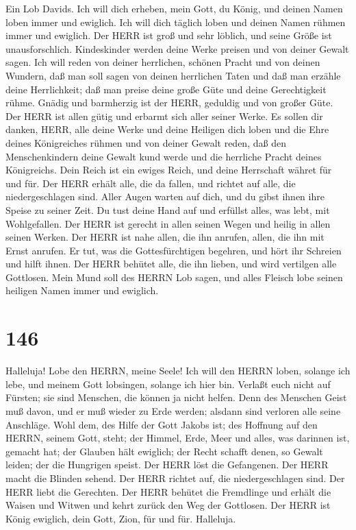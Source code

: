  Ein Lob Davids. Ich will dich erheben, mein Gott, du König,
und deinen Namen loben immer und ewiglich.  Ich will dich
täglich loben und deinen Namen rühmen immer und ewiglich. 
Der HERR ist groß und sehr löblich, und seine Größe ist unausforschlich.
 Kindeskinder werden deine Werke preisen und von deiner
Gewalt sagen.  Ich will reden von deiner herrlichen, schönen
Pracht und von deinen Wundern,  daß man soll sagen von
deinen herrlichen Taten und daß man erzähle deine Herrlichkeit;
 daß man preise deine große Güte und deine Gerechtigkeit
rühme.  Gnädig und barmherzig ist der HERR, geduldig und von
großer Güte.  Der HERR ist allen gütig und erbarmt sich
aller seiner Werke.  Es sollen dir danken, HERR, alle deine
Werke und deine Heiligen dich loben  und die Ehre deines
Königreiches rühmen und von deiner Gewalt reden,  daß den
Menschenkindern deine Gewalt kund werde und die herrliche Pracht deines
Königreichs.  Dein Reich ist ein ewiges Reich, und deine
Herrschaft währet für und für.  Der HERR erhält alle, die
da fallen, und richtet auf alle, die niedergeschlagen sind.
 Aller Augen warten auf dich, und du gibst ihnen ihre
Speise zu seiner Zeit.  Du tust deine Hand auf und erfüllst
alles, was lebt, mit Wohlgefallen.  Der HERR ist gerecht in
allen seinen Wegen und heilig in allen seinen Werken.  Der
HERR ist nahe allen, die ihn anrufen, allen, die ihn mit Ernst anrufen.
 Er tut, was die Gottesfürchtigen begehren, und hört ihr
Schreien und hilft ihnen.  Der HERR behütet alle, die ihn
lieben, und wird vertilgen alle Gottlosen.  Mein Mund soll
des HERRN Lob sagen, und alles Fleisch lobe seinen heiligen Namen immer
und ewiglich.

\hypertarget{section-145}{%
\section{146}\label{section-145}}

 Halleluja! Lobe den HERRN, meine Seele!  Ich
will den HERRN loben, solange ich lebe, und meinem Gott lobsingen,
solange ich hier bin.  Verlaßt euch nicht auf Fürsten; sie
sind Menschen, die können ja nicht helfen.  Denn des
Menschen Geist muß davon, und er muß wieder zu Erde werden; alsdann sind
verloren alle seine Anschläge.  Wohl dem, des Hilfe der Gott
Jakobs ist; des Hoffnung auf den HERRN, seinem Gott, steht; 
der Himmel, Erde, Meer und alles, was darinnen ist, gemacht hat; der
Glauben hält ewiglich;  der Recht schafft denen, so Gewalt
leiden; der die Hungrigen speist. Der HERR löst die Gefangenen.
 Der HERR macht die Blinden sehend. Der HERR richtet auf,
die niedergeschlagen sind. Der HERR liebt die Gerechten. 
Der HERR behütet die Fremdlinge und erhält die Waisen und Witwen und
kehrt zurück den Weg der Gottlosen.  Der HERR ist König
ewiglich, dein Gott, Zion, für und für. Halleluja.

